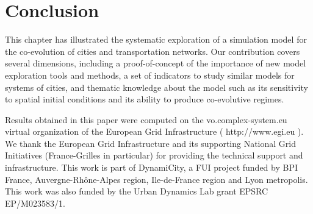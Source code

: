 \documentclass[graybox]{svmult}
\begin{document}
\section{Conclusion}



This chapter has illustrated the systematic exploration of a simulation model for the co-evolution of cities and transportation networks. Our contribution covers several dimensions, including a proof-of-concept of the importance of new model exploration tools and methods, a set of indicators to study similar models for systems of cities, and thematic knowledge about the model such as its sensitivity to spatial initial conditions and its ability to produce co-evolutive regimes.





%
\begin{acknowledgement}
Results obtained in this paper were computed on the vo.complex-system.eu virtual organization of the European Grid Infrastructure ( http://www.egi.eu ). We thank the European Grid Infrastructure and its supporting National Grid Initiatives (France-Grilles in particular) for providing the technical support and infrastructure. This work is part of DynamiCity, a FUI project funded by BPI France, Auvergne-Rhône-Alpes region, Ile-de-France region and Lyon metropolis. This work was also funded by the Urban Dynamics Lab grant EPSRC EP/M023583/1.
\end{acknowledgement}


%
%
\end{document}
